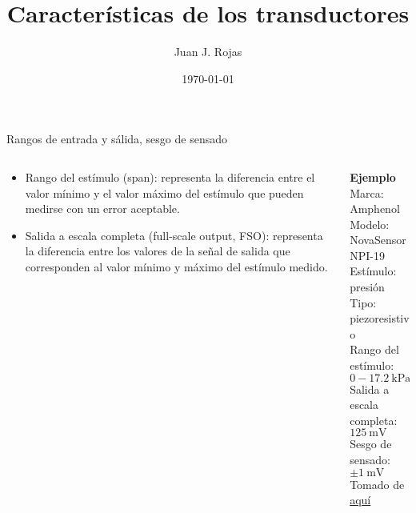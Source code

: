\documentclass[aspectratio=169]{beamer}
\title{Características de los transductores}
\author{
    Juan J. Rojas
}
\institute{Instituto Tecnológico de Costa Rica}
\date{\today}
\begin{document}

\maketitle

\newcommand{\blackandwhite}{white} %

\begin{frame}{Rangos de entrada y sálida, sesgo de sensado}
    \begin{columns}[c, onlytextwidth]
        \begin{column}{0.50\textwidth}
            \begin{itemize}
                \item Rango del estímulo (span): representa la diferencia entre el valor mínimo y el valor máximo del estímulo que pueden medirse con un error aceptable.
                \item Salida a escala completa (full-scale output, FSO): representa la diferencia entre los valores de la señal de salida que corresponden al valor mínimo y máximo del estímulo medido. 
            \end{itemize}
        \end{column}
        \begin{column}{0.45\textwidth}
            \textbf{Ejemplo}\\[4pt]
            Marca: Amphenol\\[4pt]
            Modelo: NovaSensor NPI-19\\[4pt]
            Estímulo: presión\\[4pt]
            Tipo: piezoresistivo\\[4pt]
            Rango del estímulo: $0  - \SI{17.2}{\kilo\pascal}$\\[4pt]
            Salida a escala completa: $\SI{125}{\milli\volt}$\\[4pt]
            Sesgo de sensado: $\pm \SI{1}{\milli\volt}$\\[10pt]
            \tiny{Tomado de \href{https://f.hubspotusercontent40.net/hubfs/9035299/Documents/AAS-920-298B-NovaSensor\%20NPI-19-REVISED-061714-web.pdf}{aquí}}
        \end{column}
    \end{columns}
\end{frame}
\end{document}
